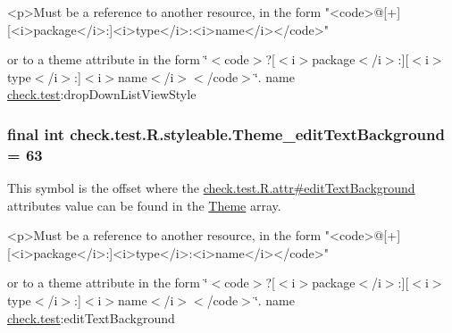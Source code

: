 \begin{DoxyVerb}      <p>Must be a reference to another resource, in the form "<code>@[+][<i>package</i>:]<i>type</i>:<i>name</i></code>"
\end{DoxyVerb}
 or to a theme attribute in the form \char`\"{}$<$code$>$?\mbox{[}$<$i$>$package$<$/i$>$\+:\mbox{]}\mbox{[}$<$i$>$type$<$/i$>$\+:\mbox{]}$<$i$>$name$<$/i$>$$<$/code$>$\char`\"{}.  name \hyperlink{namespacecheck_1_1test}{check.\+test}\+:drop\+Down\+List\+View\+Style \hypertarget{classcheck_1_1test_1_1_r_1_1styleable_ab28653ef2c423653f679a95b9eb7e7fa}{}
\subsubsection[{Theme\+\_\+edit\+Text\+Background}]{\setlength{\rightskip}{0pt plus 5cm}final int check.\+test.\+R.\+styleable.\+Theme\+\_\+edit\+Text\+Background = 63\hspace{0.3cm}{\ttfamily [static]}}\label{classcheck_1_1test_1_1_r_1_1styleable_ab28653ef2c423653f679a95b9eb7e7fa}
This symbol is the offset where the \hyperlink{classcheck_1_1test_1_1_r_1_1attr_a730ff093ffe34aee1d53f2e640ede7ed}{check.\+test.\+R.\+attr\#edit\+Text\+Background} attribute\textquotesingle{}s value can be found in the \hyperlink{classcheck_1_1test_1_1_r_1_1styleable_acca726d02016a0cf607782ec3a436a81}{Theme} array.

\begin{DoxyVerb}      <p>Must be a reference to another resource, in the form "<code>@[+][<i>package</i>:]<i>type</i>:<i>name</i></code>"
\end{DoxyVerb}
 or to a theme attribute in the form \char`\"{}$<$code$>$?\mbox{[}$<$i$>$package$<$/i$>$\+:\mbox{]}\mbox{[}$<$i$>$type$<$/i$>$\+:\mbox{]}$<$i$>$name$<$/i$>$$<$/code$>$\char`\"{}.  name \hyperlink{namespacecheck_1_1test}{check.\+test}\+:edit\+Text\+Background \hypertarget{classcheck_1_1test_1_1_r_1_1styleable_ab8022b2bf8b784e17530f17a05186fa2}{}
